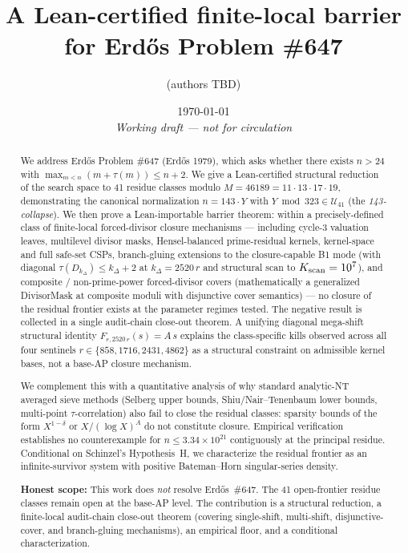 \documentclass[11pt,a4paper]{article}
\title{A Lean-certified finite-local barrier \\[2pt] for Erd\H{o}s Problem \#647}
\author{(authors TBD)}
\date{\today\\[6pt] \textit{Working draft --- not for circulation}}
\theoremstyle{definition}
\newcommand{\tauf}{\tau}                              %
\newcommand{\Uset}{\mathcal{U}_{41}}
\begin{document}
\maketitle

\begin{abstract}
We address Erd\H{o}s Problem \#647 (Erd\H{o}s 1979), which asks
whether there exists $n > 24$ with
$\max_{m < n}(m + \tauf(m)) \le n + 2$.
We give a Lean-certified structural reduction of the search space
to 41 residue classes modulo $M = 46189 = 11 \cdot 13 \cdot 17 \cdot 19$,
demonstrating the canonical normalization $n = 143 \cdot Y$ with
$Y \bmod 323 \in \Uset$ (the \emph{143-collapse}). We then prove a
Lean-importable barrier theorem: within a precisely-defined class
of finite-local forced-divisor closure mechanisms --- including
cycle-3 valuation leaves, multilevel divisor masks, Hensel-balanced
prime-residual kernels, kernel-space and full safe-set CSPs,
branch-gluing extensions to the closure-capable B1 mode (with
diagonal $\tauf(D_{k_\Delta}) \le k_\Delta + 2$ at
$k_\Delta = 2520\, r$ and structural scan to $K_{\rm scan} = 10^7$),
and composite / non-prime-power forced-divisor covers (mathematically
a generalized DivisorMask at composite moduli with disjunctive cover
semantics) --- no closure of the residual frontier exists at the
parameter regimes tested. The negative result is collected in a
single audit-chain close-out theorem. A unifying diagonal mega-shift
structural identity $F_{r, 2520\, r}(s) = A\, s$ explains the
class-specific kills observed across all four sentinels
$r \in \{858, 1716, 2431, 4862\}$ as a structural constraint on
admissible kernel bases, not a base-AP closure mechanism.

We complement this with a quantitative analysis of why standard
analytic-NT averaged sieve methods (Selberg upper bounds,
Shiu/Nair--Tenenbaum lower bounds, multi-point
$\tauf$-correlation) also fail to close the residual classes:
sparsity bounds of the form $X^{1-\delta}$ or $X / (\log X)^A$
do not constitute closure. Empirical verification establishes no
counterexample for $n \le 3.34 \times 10^{21}$ contiguously at the
principal residue. Conditional on Schinzel's Hypothesis~H, we
characterize the residual frontier as an infinite-survivor system
with positive Bateman--Horn singular-series density.

\smallskip\noindent
\textbf{Honest scope:} This work does \emph{not} resolve
Erd\H{o}s~\#647. The 41 open-frontier residue classes remain open at
the base-AP level. The contribution is a structural reduction,
a finite-local audit-chain close-out theorem (covering single-shift,
multi-shift, disjunctive-cover, and branch-gluing mechanisms),
an empirical floor, and a conditional characterization.
\end{abstract}

\tableofcontents













\end{document}
